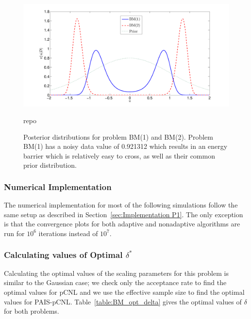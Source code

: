 \documentclass[final]{siamltex}
\begin{document}
\begin{figure}[htpb]
\begin{center}
\includegraphics[width=\textwidth]{"figures/posteriors3"}
\caption{Posterior distributions for problem BM(1) and BM(2). Problem BM(1) has a noisy data value of  0.921312 which results in an energy barrier which is relatively easy to cross, as well as their common prior distribution.}
\label{fig:problem 3 posteriors}
\end{center}repo
\end{figure}

\subsubsection{Numerical Implementation}\label{sec:Implementation P2}

The numerical implementation for most of the following simulations follow the same setup as described in Section~\ref{sec:Implementation P1}. The only exception is that the convergence plots for both adaptive and nonadaptive algorithms are run for $10^6$ iterations instead of $10^7$.

\subsubsection{Calculating values of Optimal $\delta^*$}\label{sec:BM1_opt_delta}

Calculating the optimal values of the scaling parameters for this problem is similar to the Gaussian case; we check only the acceptance rate to find the optimal values for pCNL and we use the effective sample size to find the optimal values for PAIS-pCNL. Table~\ref{table:BM_opt_delta} gives the optimal values of $\delta$ for both problems.
\end{document}
